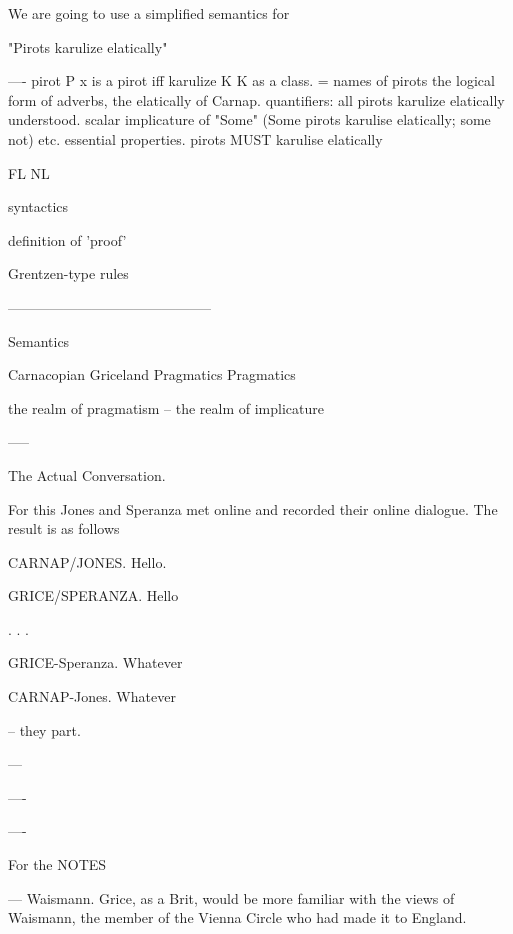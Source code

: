 \documentclass[10pt,titlepage]{book}
\begin{document}
 
 
 We are going to use a simplified semantics for
 
         "Pirots karulize  elatically"
 
---- pirot P  x is a pirot iff
    karulize K   K as  a class. = 
    names of pirots
    the logical form of adverbs, the elatically of  Carnap.
    quantifiers: all pirots karulize elatically  understood.
          scalar implicature  of "Some" (Some pirots karulise elatically; 
some not)
    etc.
    essential properties.
        pirots MUST karulise  elatically
 
 
 
          FL                                          NL
 
 
                  syntactics
 
                 
 
                definition of 'proof'
 
                
              
                 Grentzen-type rules
 
 
           --------------------------------------------
 
                   Semantics
 
 
Carnacopian                        Griceland
Pragmatics                       Pragmatics
 
the realm 
of 
pragmatism                                -- the realm of implicature
 
 
 
 
-----
 
The Actual Conversation.
 
For this Jones and Speranza
met online and recorded their online
dialogue. The result is as follows
 
 
CARNAP/JONES. Hello.
 
GRICE/SPERANZA. Hello
 
.
.
.
 
 
 
 
 
GRICE-Speranza. Whatever
 
CARNAP-Jones. Whatever
 
             --  they part.
 
---
 
----
 
 
----
 
 
For the NOTES
 
 
--- Waismann. Grice, as a Brit, would be more familiar with the views of  
Waismann, the member of the Vienna Circle who had made it to England. 
 
\end{document}
